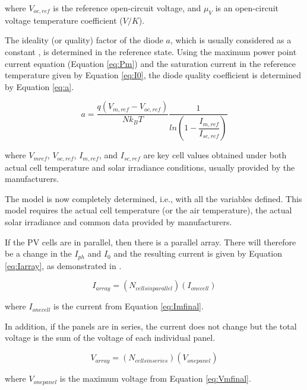 \noindent where $ V_{oc,ref} $ is the reference open-circuit voltage, and $ \mu_{V} $ is an open-circuit voltage temperature coefficient ($ V/K $).

The ideality (or quality) factor of the diode $ a $, which is usually considered as a constant \cite{Villalva}, is determined in the reference state. Using the maximum power point current equation (Equation \ref{eq:Pm}) and the saturation current in the reference temperature given by Equation \ref{eq:I0}, the diode quality coefficient is determined by Equation \ref{eq:a}.

\begin{equation}
\label{eq:a}
a = \dfrac{q(V_{m,ref}-V_{oc,ref})}{Nk_{B}T} \dfrac{1}{ln \left( 1 - \dfrac{I_{m,ref}}{I_{sc,ref}}  \right) }
\end{equation}

\noindent where $ V_{mref} $, $ V_{oc,ref} $, $ I_{m,ref} $, and $ I_{sc,ref} $ are key cell values obtained under both actual cell temperature and solar irradiance conditions, usually provided by the manufacturers.

The model is now completely determined, i.e., with all the variables defined. This model requires the actual cell temperature (or the air temperature), the actual solar irradiance and common data provided by manufacturers.

If the PV cells are in parallel, then there is a parallel array. There will therefore be a change in the $ I_{ph} $ and $ I_{0} $ and the resulting current is given by Equation \ref{eq:Iarray}, as demonstrated in \cite{Saloux}.

\begin{equation}
\label{eq:Iarray}
I_{array} = (N_{cells in parallel})(I_{one cell})
\end{equation}

\noindent where $ I_{one cell} $ is the current from Equation \ref{eq:Imfinal}.

In addition, if the panels are in series, the current does not change but the total voltage is the sum of the voltage of each individual panel.

\begin{equation}
\label{eq:Varray}
V_{array} = (N_{cells in series})(V_{one panel})
\end{equation}

\noindent where $ V_{one panel} $ is the maximum voltage from Equation \ref{eq:Vmfinal}.

